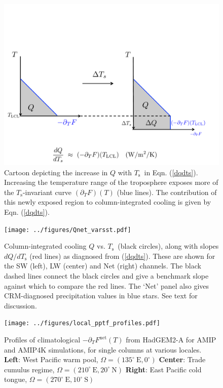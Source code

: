 \documentclass[10pt]{article}
\newcommand{\eqnref}[1]{(\ref{#1})}
\newcommand{\ppt}{\ensuremath{\partial_T}}
\newcommand{\Fnet}{\ensuremath{F^\mathrm{net}}}
\newcommand{\Ts}{\ensuremath{T_\mathrm{s}}}
\newcommand{\east}{\ensuremath{\mathrm{E}}}
\newcommand{\north}{\ensuremath{\mathrm{N}}}
\newcommand{\south}{\ensuremath{\mathrm{S}}}
\begin{document}
\begin{figure}[h]
	\begin{center}
			\includegraphics[scale=0.65,trim=0cm 0cm 0cm 5cm,clip=true]{../figures/dqdts_cartoon.pdf}
		\caption{Cartoon depicting the increase in $Q$ with \Ts\ in Eqn. \eqnref{dqdts}. Increasing the temperature range of the troposphere  exposes more of the \Ts-invariant curve $(\ppt F)(T)$ (blue lines). The contribution  of this newly exposed region to column-integrated cooling is given by Eqn. \eqnref{dqdts}.
		\label{dqdts_cartoon}
		}
	\end{center}
\end{figure}


\begin{figure}[h]
	\begin{center}
			\texttt{[image: ../figures/Qnet\_varsst.pdf]}
		\caption{Column-integrated cooling $Q$ vs. \Ts\ (black circles), along with slopes $d Q/d \Ts$ (red lines) as diagnosed from \eqnref{dqdts}. These are shown for the SW (left), LW (center) and Net (right) channels.  The black dashed lines connect the black circles and give a benchmark slope against which to compare the red lines. The `Net' panel also gives CRM-diagnosed precipitation values in blue stars. See text for discussion.
		\label{Qnet_varsst}
		}
	\end{center}
\end{figure}

\begin{figure}[h]
	\begin{center}
			\texttt{[image: ../figures/local\_pptf\_profiles.pdf]}
		\caption{ Profiles of climatological $-\ppt \Fnet (T)$ from HadGEM2-A for AMIP and AMIP4K simulations, for single columns at various locales. \textbf{Left}: West Pacific warm pool, $\Omega = (135^\circ\ \east, 0^\circ)$  \textbf{Center}: Trade cumulus regime, $\Omega = (210^\circ\ \east, 20^\circ\ \north)$ \textbf{Right}: East Pacific cold tongue, $\Omega = (270^\circ\ \east, 10^\circ\ \south)$
		\label{local_pptf_profiles}
		}
	\end{center}
\end{figure}
\end{document}
